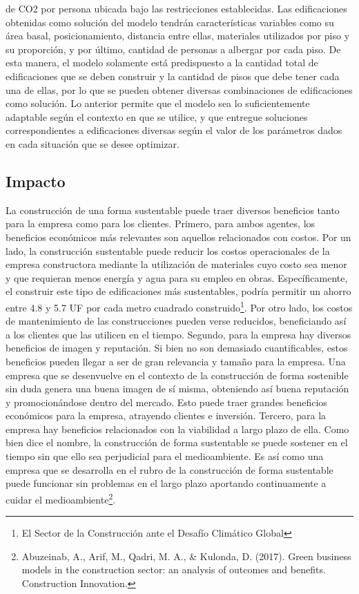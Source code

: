 \documentclass[letterpaper]{article}
\begin{document}
de CO2 por persona ubicada bajo las restricciones establecidas. Las edificaciones obtenidas como solución del modelo tendrán características variables como su área basal, posicionamiento,
distancia entre ellas, materiales utilizados por piso y su proporción, y por último, cantidad  de personas a albergar por cada piso. De esta manera, el modelo solamente está predispuesto a la cantidad total de edificaciones
que se deben construir y la cantidad de pisos que debe tener cada una de ellas, por lo que se pueden obtener diversas combinaciones de edificaciones como solución. 
Lo anterior permite que el modelo sea lo suficientemente adaptable según el contexto en que se utilice, y que entregue soluciones correspondientes a edificaciones diversas según el valor de los parámetros dados en cada situación que se desee optimizar. 



\subsection{Impacto}

La construcción de una forma sustentable puede traer diversos beneficios tanto para la empresa como para los clientes. Primero, para ambos agentes,
los beneficios económicos más relevantes son aquellos relacionados con costos. Por un lado, la construcción sustentable puede reducir los costos operacionales de la
empresa constructora mediante la utilización de materiales cuyo costo sea menor y que requieran menos energía y agua para su empleo en obras. Específicamente, 
el construir este tipo de edificaciones más sustentables, podría permitir un ahorro entre 4.8 y 5.7 UF por cada metro cuadrado construido\footnote{El Sector de la Construcción ante el Desafío Climático Global}.
Por otro lado, los costos de mantenimiento de las construcciones pueden verse reducidos, beneficiando así a los clientes que las utilicen en el tiempo. Segundo,
para la empresa hay diversos beneficios de imagen y reputación. Si bien no son demasiado cuantificables, estos beneficios pueden llegar a ser de gran relevancia y
tamaño para la empresa. Una empresa que se desenvuelve en el contexto de la construcción de forma sostenible sin duda genera una buena imagen de sí misma,
obteniendo así buena reputación y promocionándose dentro del mercado. Esto puede traer grandes beneficios económicos para la empresa, atrayendo clientes e inversión.
Tercero, para la empresa hay beneficios relacionados con la viabilidad a largo plazo de ella. Como bien dice el nombre, la construcción de forma sustentable se
puede sostener en el tiempo sin que ello sea perjudicial para el medioambiente. Es así como una empresa que se desarrolla en el rubro de la construcción
de forma sustentable puede funcionar sin problemas en el largo plazo aportando continuamente a cuidar el medioambiente\footnote{Abuzeinab, A., Arif, M., Qadri, M. A., \& Kulonda, D. (2017). Green business models in the construction sector: an analysis of outcomes and benefits. Construction Innovation.}.
\end{document}
